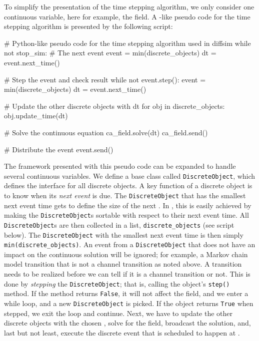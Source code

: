 \label{sec:hake:event-driven-simulator}
To simplify the presentation of the time stepping algorithm, we only
consider one continuous variable, here for example, the \Ca field. A
-like pseudo code for the time stepping algorithm
is presented by the following script:
\begin{python}
# Python-like pseudo code for the time stepping algorithm used in diffsim
while not stop_sim:
    # The next event
    event = min(discrete_objects)
    dt = event.next_time()

    # Step the event and check result
    while not event.step():
        event = min(discrete_objects)
        dt = event.next_time()

    # Update the other discrete objects with dt
    for obj in discrete_objects:
        obj.update_time(dt)

    # Solve the continuous equation
    ca_field.solve(dt)
    ca_field.send()

    # Distribute the event
    event.send()
\end{python}
The framework presented with this pseudo code can be expanded to
handle several continuous variables. We define a base class called
\texttt{DiscreteObject}, which defines the interface for all discrete
objects. A key function of a discrete object is to know when its
\textit{next event} is due. The \texttt{DiscreteObject} that has the
smallest next event time gets to define the size of the next \Dt. In
, this is easily achieved by making the
\texttt{DiscreteObject}s sortable with respect to their next event
time. All \texttt{DiscreteObject}s are then collected in a list,
\texttt{discrete\_objects} (see script below). The
\texttt{DiscreteObject} with the smallest next event time is then
simply \texttt{min(discrete\_objects)}. An event from a
\texttt{DiscreteObject} that does not have an impact on the continuous
solution will be ignored; for example, a Markov chain model transition
that is not a channel transition as noted above. A transition needs to
be realized before we can tell if it is a channel transition or
not. This is done by \textit{stepping} the \texttt{DiscreteObject};
that is, calling the object's \texttt{step()} method. If the method
returns \texttt{False}, it will not affect the \Ca field, and we enter
a while loop, and a new \texttt{DiscreteObject} is picked. If the
object returns \texttt{True} when stepped, we exit the loop and
continue. Next, we have to update the other discrete objects with the
chosen \Dt, solve for the \Ca field, broadcast the solution, and, last
but not least, execute the discrete event that is scheduled to happen
at \Dt.

